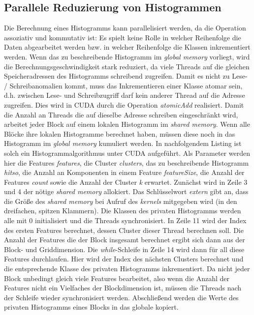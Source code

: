 \subsection{Parallele Reduzierung von Histogrammen}

Die Berechnung eines Histogramms kann parallelisiert werden, da die Operation assoziativ und kommutativ ist: Es spielt keine Rolle in welcher Reihenfolge die Daten abgearbeitet werden bzw. in welcher Reihenfolge die Klassen inkrementiert werden. Wenn das zu beschreibende Histogramm im \textit{global memory} vorliegt, wird die Berechnungsgeschwindigkeit stark reduziert, da viele Threads auf die gleichen Speicheradressen des Histogramms schreibend zugreifen. Damit es nicht zu Lese- / Schreibanomalien kommt, muss das Inkrementieren einer Klasse atomar sein, d.h. zwischen Lese- und Schreibzugriff darf kein anderer Thread auf die Adresse zugreifen. Dies wird in CUDA durch die Operation \textit{atomicAdd} realisiert. Damit die Anzahl an Threads die auf dieselbe Adresse schreiben eingeschränkt wird, arbeitet jeder Block auf einem lokalen Histogramm im \textit{shared memory}. Wenn alle Blöcke ihre lokalen Histogramme berechnet haben, müssen diese noch in das Histogramm im \textit{global memory} kumuliert werden.\newline
In nachfolgendem Listing ist solch ein Histogrammalgorithmus unter CUDA aufgeführt. Als Parameter werden hier die Features \textit{features}, die Cluster \textit{clusters}, das zu beschreibende Histogramm \textit{hitso}, die Anzahl an Komponenten in einem Feature \textit{featureSize}, die Anzahl der Features \textit{count} sowie die Anzahl der Cluster \textit{k} erwartet. Zunächst wird in Zeile 3 und 4 der nötige \textit{shared memory} allokiert. Das Schlüsselwort \textit{extern} gibt an, dass die Größe des \textit{shared memory} bei Aufruf des \textit{kernels} mitgegeben wird (in den dreifachen, spitzen Klammern). Die Klassen des privaten Histogramms werden alle mit 0 initialisiert und die Threads synchronisiert. In Zeile 11 wird der Index des ersten Features berechnet, dessen Cluster dieser Thread berechnen soll. Die Anzahl der Features die der Block insgesamt berechnet ergibt sich dann aus der Block- und Griddimension. Die \textit{while}-Schleife in Zeile 14 wird dann für all diese Features durchlaufen. Hier wird der Index des nächsten Clusters berechnet und die entsprechende Klasse des privaten Histogramms inkrementiert. Da nicht jeder Block unbedingt gleich viele Features bearbeitet, also wenn die Anzahl der Features nicht ein Vielfaches der Blockdimension ist, müssen die Threads nach der Schleife wieder synchronisiert werden. Abschließend werden die Werte des privaten Histogramms eines Blocks in das globale kopiert.

